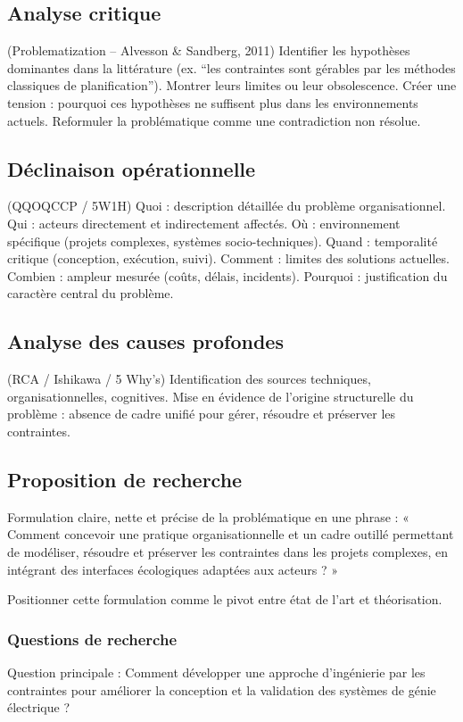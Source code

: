 \documentclass[a4paper,12pt]{article}
\begin{document}
\subsection{Analyse critique}
\label{sec:orgabe38e5}
(Problematization – Alvesson \& Sandberg, 2011)
Identifier les hypothèses dominantes dans la littérature (ex. “les contraintes sont gérables par les méthodes classiques de planification”).
Montrer leurs limites ou leur obsolescence.
Créer une tension : pourquoi ces hypothèses ne suffisent plus dans les environnements actuels.
Reformuler la problématique comme une contradiction non résolue.
\subsection{Déclinaison opérationnelle}
\label{sec:org5983191}
(QQOQCCP / 5W1H)
Quoi : description détaillée du problème organisationnel.
Qui : acteurs directement et indirectement affectés.
Où : environnement spécifique (projets complexes, systèmes socio-techniques).
Quand : temporalité critique (conception, exécution, suivi).
Comment : limites des solutions actuelles.
Combien : ampleur mesurée (coûts, délais, incidents).
Pourquoi : justification du caractère central du problème.
\subsection{Analyse des causes profondes}
\label{sec:orgcce4896}
(RCA / Ishikawa / 5 Why’s)
Identification des sources techniques, organisationnelles, cognitives.
Mise en évidence de l’origine structurelle du problème : absence de cadre unifié pour gérer, résoudre et préserver les contraintes.
\subsection{Proposition de recherche}
\label{sec:org7e73ec6}
Formulation claire, nette et précise de la problématique en une phrase :
« Comment concevoir une pratique organisationnelle et un cadre outillé permettant de modéliser, résoudre et préserver les contraintes dans les projets complexes, en intégrant des interfaces écologiques adaptées aux acteurs ? »

Positionner cette formulation comme le pivot entre état de l’art et théorisation.
\subsubsection{Questions de recherche}
\label{sec:org7d11880}
Question principale : Comment développer une approche d'ingénierie par les contraintes pour améliorer la conception et la validation des systèmes de génie électrique ?
\end{document}
